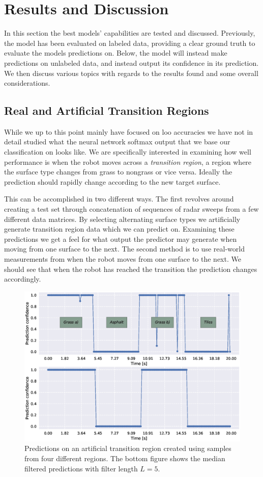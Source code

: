 \chapter{Results and Discussion}
In this section the best models' capabilities are tested and discussed. Previously, the model has been evaluated on labeled data, providing a clear ground truth to evaluate the models predictions on. Below, the model will instead make predictions on unlabeled data, and instead output its confidence in its prediction. We then discuss various topics with regards to the results found and some overall considerations.

\section{Real and Artificial Transition Regions}

While we up to this point mainly have focused on \gls{loo} accuracies we have not in detail studied what the neural network softmax output that we base our classification on looks like. We are specifically interested in examining how well performance is when the robot moves across a \emph{transition region}, a region where the surface type changes from grass to nongrass or vice versa. Ideally the prediction should rapidly change according to the new target surface. 

This can be accomplished in two different ways. The first revolves around creating a test set through concatenation of sequences of radar sweeps from a few different data matrices. By selecting alternating surface types we artificially generate transition region data which we can predict on. Examining these predictions we get a feel for what output the predictor may generate when moving from one surface to the next. The second method is to use real-world measurements from when the robot moves from one surface to the next. We should see that when the robot has reached the transition the prediction changes accordingly. 

\begin{figure}[t]
	\centering
	\includegraphics[scale=0.5]{figs_temp/varmats1}
	\caption{Predictions on an artificial transition region created using samples from four different regions. The bottom figure shows the median filtered predictions with filter length $L=5$.}
	\label{fig:artificial1}
\end{figure}

